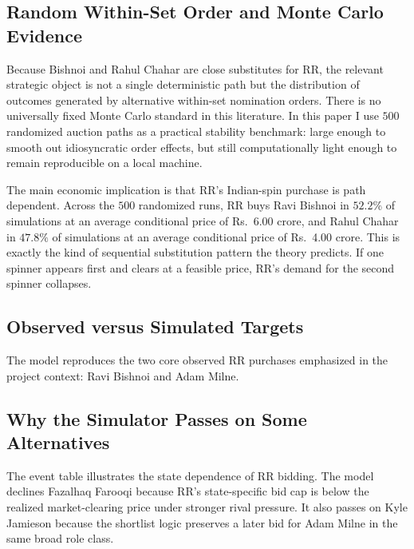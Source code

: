 \documentclass[11pt]{article}
\begin{document}
\subsection{Random Within-Set Order and Monte Carlo Evidence}

Because Bishnoi and Rahul Chahar are close substitutes for RR, the relevant strategic object is not a single deterministic path but the distribution of outcomes generated by alternative within-set nomination orders. There is no universally fixed Monte Carlo standard in this literature. In this paper I use \(500\) randomized auction paths as a practical stability benchmark: large enough to smooth out idiosyncratic order effects, but still computationally light enough to remain reproducible on a local machine.



The main economic implication is that RR's Indian-spin purchase is path dependent. Across the \(500\) randomized runs, RR buys Ravi Bishnoi in \(52.2\%\) of simulations at an average conditional price of Rs.\ 6.00 crore, and Rahul Chahar in \(47.8\%\) of simulations at an average conditional price of Rs.\ 4.00 crore. This is exactly the kind of sequential substitution pattern the theory predicts. If one spinner appears first and clears at a feasible price, RR's demand for the second spinner collapses.

\subsection{Observed versus Simulated Targets}



The model reproduces the two core observed RR purchases emphasized in the project context: Ravi Bishnoi and Adam Milne.

\subsection{Why the Simulator Passes on Some Alternatives}



The event table illustrates the state dependence of RR bidding. The model declines Fazalhaq Farooqi because RR's state-specific bid cap is below the realized market-clearing price under stronger rival pressure. It also passes on Kyle Jamieson because the shortlist logic preserves a later bid for Adam Milne in the same broad role class.
\end{document}
